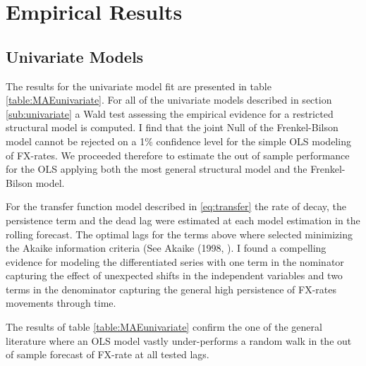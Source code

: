\section{Empirical Results}
\label{sec:results}

\subsection{Univariate Models}

The results for the univariate model fit are presented in table
\ref{table:MAEunivariate}.  For all of the univariate models described
in section \ref{sub:univariate} a Wald test assessing the empirical
evidence for a restricted structural model is computed. I find that
the joint Null of the Frenkel-Bilson model cannot be rejected on a 1\%
confidence level for the simple OLS modeling of FX-rates.  We
proceeded therefore to estimate the out of sample performance for the
OLS applying both the most general structural model and the
Frenkel-Bilson model.

For the transfer function model described in \ref{eq:transfer} the
rate of decay, the persistence term and the dead lag were estimated at
each model estimation in the rolling forecast. The optimal lags for
the terms above where selected minimizing the Akaike information
criteria (See Akaike (1998, \cite{Akaike}). I found a compelling
evidence for modeling the differentiated series with one term in the
nominator capturing the effect of unexpected shifts in the independent
variables and two terms in the denominator capturing the general high
persistence of FX-rates movements through time.

The results of table \ref{table:MAEunivariate} confirm the one of the
general literature where an OLS model vastly under-performs a random
walk in the out of sample forecast of FX-rate at all tested lags.

